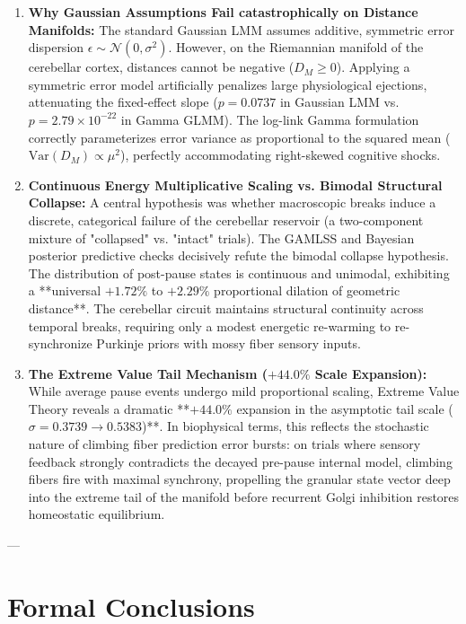 \documentclass[11pt,twoside,a4paper]{article}
\begin{document}
\begin{enumerate}
    \item \textbf{Why Gaussian Assumptions Fail catastrophically on Distance Manifolds:}
    The standard Gaussian LMM assumes additive, symmetric error dispersion $\epsilon \sim \mathcal{N}(0, \sigma^2)$. However, on the Riemannian manifold of the cerebellar cortex, distances cannot be negative ($D_M \ge 0$). Applying a symmetric error model artificially penalizes large physiological ejections, attenuating the fixed-effect slope ($p = 0.0737$ in Gaussian LMM vs. $p = 2.79 \times 10^{-22}$ in Gamma GLMM). The log-link Gamma formulation correctly parameterizes error variance as proportional to the squared mean ($\text{Var}(D_M) \propto \mu^2$), perfectly accommodating right-skewed cognitive shocks.
    
    \item \textbf{Continuous Energy Multiplicative Scaling vs. Bimodal Structural Collapse:}
    A central hypothesis was whether macroscopic breaks induce a discrete, categorical failure of the cerebellar reservoir (a two-component mixture of "collapsed" vs. "intact" trials). The GAMLSS and Bayesian posterior predictive checks decisively refute the bimodal collapse hypothesis. The distribution of post-pause states is continuous and unimodal, exhibiting a **universal $+1.72\%$ to $+2.29\%$ proportional dilation of geometric distance**. The cerebellar circuit maintains structural continuity across temporal breaks, requiring only a modest energetic re-warming to re-synchronize Purkinje priors with mossy fiber sensory inputs.
    
    \item \textbf{The Extreme Value Tail Mechanism ($+44.0\%$ Scale Expansion):}
    While average pause events undergo mild proportional scaling, Extreme Value Theory reveals a dramatic **$+44.0\%$ expansion in the asymptotic tail scale ($\sigma = 0.3739 \to 0.5383$)**. In biophysical terms, this reflects the stochastic nature of climbing fiber prediction error bursts: on trials where sensory feedback strongly contradicts the decayed pre-pause internal model, climbing fibers fire with maximal synchrony, propelling the granular state vector deep into the extreme tail of the manifold before recurrent Golgi inhibition restores homeostatic equilibrium.
\end{enumerate}

---

\section{Formal Conclusions}
\end{document}
